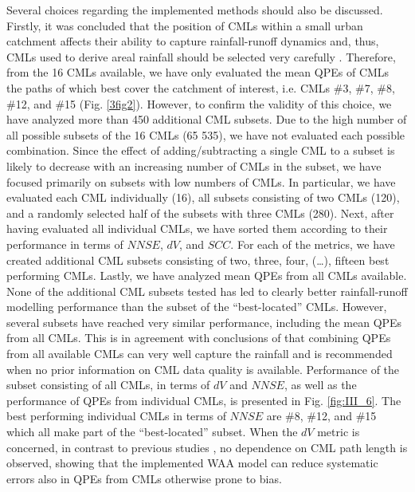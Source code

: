 \documentclass{ctuthesis}\usepackage[]{graphicx}\usepackage[]{color}
\begin{document}
Several choices regarding the implemented methods should also be discussed. Firstly, it was concluded that the position of CMLs within a small urban catchment affects their ability to capture rainfall-runoff dynamics and, thus, CMLs used to derive areal rainfall should be selected very carefully \citep[][chapter \ref{chap5}]{fenclCommercialMicrowaveLinks2015, pastorekCommercialMicrowaveLinks2019}. Therefore, from the 16 CMLs available, we have only evaluated the mean QPEs of CMLs the paths of which best cover the catchment of interest, i.e. CMLs \#3, \#7, \#8, \#12, and \#15 (Fig. \ref{3fig2}). However, to confirm the validity of this choice, we have analyzed more than 450 additional CML subsets. Due to the high number of all possible subsets of the 16 CMLs (65 535), we have not evaluated each possible combination. Since the effect of adding/subtracting a single CML to a subset is likely to decrease with an increasing number of CMLs in the subset, we have focused primarily on subsets with low numbers of CMLs. In particular, we have evaluated each CML individually (16), all subsets consisting of two CMLs (120), and a randomly selected half of the subsets with three CMLs (280). Next, after having evaluated all individual CMLs, we have sorted them according to their performance in terms of $N\!N\!S\!E$, $dV$, and $S\!C\!C$. For each of the metrics, we have created additional CML subsets consisting of two, three, four, (…), fifteen best performing CMLs. Lastly, we have analyzed mean QPEs from all CMLs available. None of the additional CML subsets tested has led to clearly better rainfall-runoff modelling performance than the subset of the \enquote{best-located} CMLs. However, several subsets have reached very similar performance, including the mean QPEs from all CMLs. This is in agreement with conclusions of \cite{fenclCommercialMicrowaveLinks2015} that combining QPEs from all available CMLs can very well capture the rainfall and is recommended when no prior information on CML data quality is available. Performance of the subset consisting of all CMLs, in terms of $dV$ and $N\!N\!SE\!$, as well as the performance of QPEs from individual CMLs, is presented in Fig. \ref{fig:III_6}. The best performing individual CMLs in terms of $N\!N\!SE\!$ are \#8, \#12, and \#15 which all make part of the \enquote{best-located} subset. When the $dV$ metric is concerned, in contrast to previous studies  \citep[][chapter \ref{chap5}]{pastorekCommercialMicrowaveLinks2019}, no dependence on CML path length is observed, showing that the implemented WAA model can reduce systematic errors  also in QPEs from CMLs otherwise prone to bias.
\end{document}
